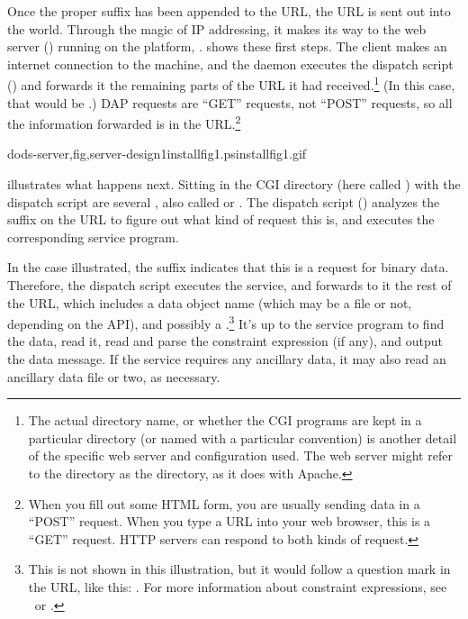 \documentclass{dods-book}
\begin{document}
Once the proper suffix has been appended to the URL, the URL is sent
out into the world.  Through the magic of IP addressing, it makes its
way to the web server () running on the platform,
.   shows
these first steps.  The client makes an internet connection to the
 machine, and the  daemon executes the
dispatch script () and forwards it the remaining
parts of the URL it had received.\footnote{The actual directory name,
  or whether the CGI programs are kept in a particular directory (or
  named with a particular convention) is another detail of the
  specific web server and configuration used.  The web server might
  refer to the directory as the  directory, as it
  does with Apache.}  (In this case, that would be
.)  DAP requests are ``GET''
requests, not ``POST'' requests, so all the
information forwarded is in the URL.\footnote{When you fill out some
  HTML form, you are usually sending data in a ``POST'' request.  When
  you type a URL into your web browser, this is a ``GET'' request.
  HTTP servers can respond to both kinds of request.}

{dods-server,fig,server-design1}{installfig1.ps}{installfig1.gif}{}

 illustrates what happens
next.  Sitting in the CGI directory (here called ) with
the dispatch script are several , also called
 or .  The dispatch script
() analyzes the suffix on the URL to figure out what
kind of request this is, and executes the corresponding service
program.


In the case illustrated, the  suffix indicates that this is
a request for binary data.  Therefore, the dispatch script executes
the  service, and forwards to it the rest of the URL,
which includes a data object name (which may be a file or not,
depending on the API), and possibly a .\footnote{This is not shown in this illustration, but it
  would follow a question mark in the URL, like this:
  .
  For more information about constraint expressions, see \DODSquick\ 
  or \DODSuser.}  It's up to the service program to find the data,
read it, read and parse the constraint expression (if any), and output
the data message.  If the service requires any ancillary data, it
may also read an ancillary data file or two, as necessary.
\end{document}
